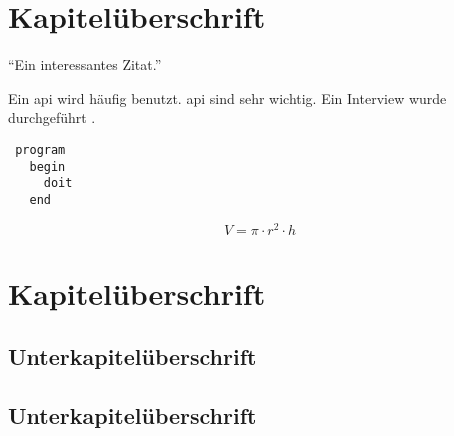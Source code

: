 \documentclass{custom}
\begin{document}
\begin{frontmatter}

\mycover
\myconfidentiality
\mytableofcontents
\mylistoffigures
\mylistoftables
\mylistofacronyms

\end{frontmatter}

\begin{mainmatter}

\section{Kapitelüberschrift}

\enquote{Ein interessantes Zitat.} \cite[1]{test}

Ein \gls{api} wird häufig benutzt. \gls{api} sind sehr wichtig. Ein Interview wurde durchgeführt .

\begin{verbatim}
 program
   begin
     doit
   end
\end{verbatim}

\begin{equation}
V= \pi \cdot r^{2} \cdot h
\end{equation}

\lipsum

\section{Kapitelüberschrift}

\lipsum

\subsection{Unterkapitelüberschrift}

\lipsum

\subsection{Unterkapitelüberschrift}

\lipsum

\end{mainmatter}

\begin{backmatter}

\mybibliography

\mylistofappendices


\mydeclaration

\end{backmatter}
\end{document}
